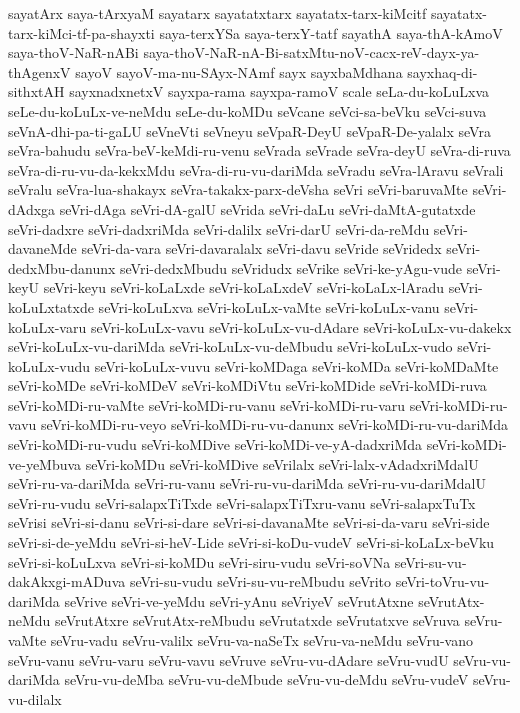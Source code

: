 {sayatArx
saya-tArxyaM
sayatarx
sayatatxtarx
sayatatx-tarx-kiMcitf
sayatatx-tarx-kiMci-tf-pa-shayxti
saya-terxYSa
saya-terxY-tatf
sayathA
saya-thA-kAmoV
saya-thoV-NaR-nABi
saya-thoV-NaR-nA-Bi-satxMtu-noV-cacx-reV-dayx-ya-thAgenxV
sayoV
sayoV-ma-nu-SAyx-NAmf
sayx
sayxbaMdhana
sayxhaq-di-sithxtAH
sayxnadxnetxV
sayxpa-rama
sayxpa-ramoV
scale
seLa-du-koLuLxva
seLe-du-koLuLx-ve-neMdu
seLe-du-koMDu
seVcane
seVci-sa-beVku
seVci-suva
seVnA-dhi-pa-ti-gaLU
seVneVti
seVneyu
seVpaR-DeyU
seVpaR-De-yalalx
seVra
seVra-bahudu
seVra-beV-keMdi-ru-venu
seVrada
seVrade
seVra-deyU
seVra-di-ruva
seVra-di-ru-vu-da-kekxMdu
seVra-di-ru-vu-dariMda
seVradu
seVra-lAravu
seVrali
seVralu
seVra-lua-shakayx
seVra-takakx-parx-deVsha
seVri
seVri-baruvaMte
seVri-dAdxga
seVri-dAga
seVri-dA-galU
seVrida
seVri-daLu
seVri-daMtA-gutatxde
seVri-dadxre
seVri-dadxriMda
seVri-dalilx
seVri-darU
seVri-da-reMdu
seVri-davaneMde
seVri-da-vara
seVri-davaralalx
seVri-davu
seVride
seVridedx
seVri-dedxMbu-danunx
seVri-dedxMbudu
seVridudx
seVrike
seVri-ke-yAgu-vude
seVri-keyU
seVri-keyu
seVri-koLaLxde
seVri-koLaLxdeV
seVri-koLaLx-lAradu
seVri-koLuLxtatxde
seVri-koLuLxva
seVri-koLuLx-vaMte
seVri-koLuLx-vanu
seVri-koLuLx-varu
seVri-koLuLx-vavu
seVri-koLuLx-vu-dAdare
seVri-koLuLx-vu-dakekx
seVri-koLuLx-vu-dariMda
seVri-koLuLx-vu-deMbudu
seVri-koLuLx-vudo
seVri-koLuLx-vudu
seVri-koLuLx-vuvu
seVri-koMDaga
seVri-koMDa
seVri-koMDaMte
seVri-koMDe
seVri-koMDeV
seVri-koMDiVtu
seVri-koMDide
seVri-koMDi-ruva
seVri-koMDi-ru-vaMte
seVri-koMDi-ru-vanu
seVri-koMDi-ru-varu
seVri-koMDi-ru-vavu
seVri-koMDi-ru-veyo
seVri-koMDi-ru-vu-danunx
seVri-koMDi-ru-vu-dariMda
seVri-koMDi-ru-vudu
seVri-koMDive
seVri-koMDi-ve-yA-dadxriMda
seVri-koMDi-ve-yeMbuva
seVri-koMDu
seVri-koMDive
seVrilalx
seVri-lalx-vAdadxriMdalU
seVri-ru-va-dariMda
seVri-ru-vanu
seVri-ru-vu-dariMda
seVri-ru-vu-dariMdalU
seVri-ru-vudu
seVri-salapxTiTxde
seVri-salapxTiTxru-vanu
seVri-salapxTuTx
seVrisi
seVri-si-danu
seVri-si-dare
seVri-si-davanaMte
seVri-si-da-varu
seVri-side
seVri-si-de-yeMdu
seVri-si-heV-Lide
seVri-si-koDu-vudeV
seVri-si-koLaLx-beVku
seVri-si-koLuLxva
seVri-si-koMDu
seVri-siru-vudu
seVri-soVNa
seVri-su-vu-dakAkxgi-mADuva
seVri-su-vudu
seVri-su-vu-reMbudu
seVrito
seVri-toVru-vu-dariMda
seVrive
seVri-ve-yeMdu
seVri-yAnu
seVriyeV
seVrutAtxne
seVrutAtx-neMdu
seVrutAtxre
seVrutAtx-reMbudu
seVrutatxde
seVrutatxve
seVruva
seVru-vaMte
seVru-vadu
seVru-valilx
seVru-va-naSeTx
seVru-va-neMdu
seVru-vano
seVru-vanu
seVru-varu
seVru-vavu
seVruve
seVru-vu-dAdare
seVru-vudU
seVru-vu-dariMda
seVru-vu-deMba
seVru-vu-deMbude
seVru-vu-deMdu
seVru-vudeV
seVru-vu-dilalx
}
